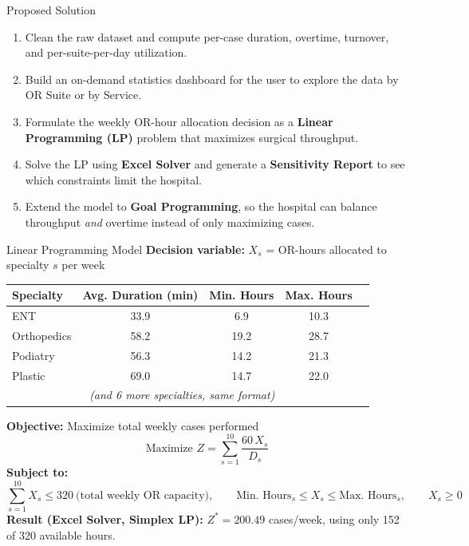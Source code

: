 \documentclass[aspectratio=169]{beamer}
\begin{document}
\begin{frame}{Proposed Solution}
    \begin{enumerate}
        \item Clean the raw dataset and compute per-case duration, overtime,
        turnover, and per-suite-per-day utilization.
        \item Build an on-demand statistics dashboard for the user to explore
        the data by OR Suite or by Service.
        \item Formulate the weekly OR-hour allocation decision as a
        \textbf{Linear Programming (LP)} problem that maximizes surgical
        throughput.
        \item Solve the LP using \textbf{Excel Solver} and generate a
        \textbf{Sensitivity Report} to see which constraints limit the hospital.
        \item Extend the model to \textbf{Goal Programming}, so the hospital
        can balance throughput \emph{and} overtime instead of only maximizing cases.
    \end{enumerate}
\end{frame}

\begin{frame}{Linear Programming Model}
    \footnotesize
    \textbf{Decision variable:} $X_s$ = OR-hours allocated to specialty $s$ per week

    \begin{center}
    \begin{tabular}{lcccc}
        \toprule
        \textbf{Specialty} & \textbf{Avg. Duration (min)} & \textbf{Min. Hours} & \textbf{Max. Hours} \\
        \midrule
        ENT            & 33.9 & 6.9  & 10.3 \\
        Orthopedics    & 58.2 & 19.2 & 28.7 \\
        Podiatry       & 56.3 & 14.2 & 21.3 \\
        Plastic        & 69.0 & 14.7 & 22.0 \\
        \multicolumn{4}{c}{\textit{(and 6 more specialties, same format)}} \\
        \bottomrule
    \end{tabular}
    \end{center}

    \textbf{Objective:} Maximize total weekly cases performed
    \[
        \text{Maximize } Z = \sum_{s=1}^{10} \frac{60\, X_s}{D_s}
    \]
    \textbf{Subject to:}
    \[
        \sum_{s=1}^{10} X_s \leq 320 \ \text{(total weekly OR capacity)}, \qquad
        \text{Min. Hours}_s \leq X_s \leq \text{Max. Hours}_s, \qquad X_s \geq 0
    \]
    \textbf{Result (Excel Solver, Simplex LP):} $Z^{*} = 200.49$ cases/week,
    using only 152 of 320 available hours.
\end{frame}
\end{document}
